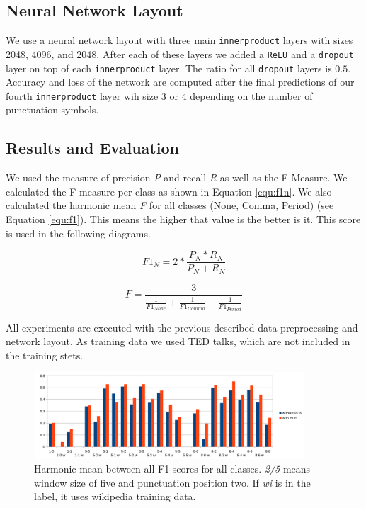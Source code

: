 
\subsection{Neural Network Layout}

We use a neural network layout with three main \texttt{innerproduct} layers with sizes 2048, 4096, and 2048.
After each of these layers we added a \texttt{ReLU} and a \texttt{dropout} layer on top of each \texttt{innerproduct} layer.
The ratio for all \texttt{dropout} layers is $0.5$.
Accuracy and loss of the network are computed after the final predictions of our fourth \texttt{innerproduct} layer wih size 3 or 4 depending on the number of punctuation symbols.

\subsection{Results and Evaluation}

We used the measure of precision \emph{P} and recall \emph{R} as well as the F-Measure. We calculated the F measure per class as shown in Equation \ref{equ:f1n}.
We also calculated the harmonic mean \emph{F} for all classes (None, Comma, Period) (see Equation \ref{equ:f1}). This means the higher that value is the better is it. This score is used in the following diagrams.

\begin{equation}
\label{equ:f1n}
F1_{N} = 2 * \frac{P_{N}* R_{N}}{P_{N}+R_{N}}
\end{equation}

\begin{equation}
\label{equ:f1}
F = \frac{3}{\frac{1}{F1_{None}} + \frac{1}{F1_{Comma}} + \frac{1}{F1_{Period}}}
\end{equation}

All experiments are executed with the previous described data preprocessing and network layout.
As training data we used TED talks, which are not included in the training stets.

\begin{figure}[ht]
    \centering
    \includegraphics[width=0.9\textwidth]{img/window_eval.png}
    \caption{Harmonic mean between all F1 scores for all classes. \emph{2/5} means window size of five and punctuation position two. If \emph{wi} is in the label, it uses wikipedia training data.}
    \label{fig:window_eval}
\end{figure}

